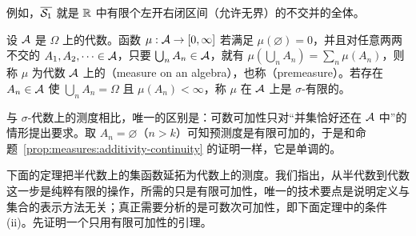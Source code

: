 例如，$\overline{\mathcal{S}_1}$ 就是 $\mathbb{R}$ 中有限个左开右闭区间（允许无界）的不交并的全体。


\begin{definition}[代数上的测度]\label{def:extension:premeasure}
设 $\mathcal{A}$ 是 $\Omega$ 上的代数。函数 $\mu:\mathcal{A}\to[0,\infty]$ 若满足 $\mu(\varnothing)=0$，并且对任意两两不交的 $A_1,A_2,\dots\in\mathcal{A}$，只要 $\bigcup_nA_n\in\mathcal{A}$，就有 $\mu(\bigcup_nA_n)=\sum_n\mu(A_n)$，则称 $\mu$ 为代数 $\mathcal{A}$ 上的（measure on an algebra），也称（premeasure）。若存在 $A_n\in\mathcal{A}$ 使 $\bigcup_nA_n=\Omega$ 且 $\mu(A_n)<\infty$，称 $\mu$ 在 $\mathcal{A}$ 上是 $\sigma$-有限的。
\end{definition}

与 $\sigma$-代数上的测度相比，唯一的区别是：可数可加性只对“并集恰好还在 $\mathcal{A}$ 中”的情形提出要求。取 $A_n=\varnothing$（$n>k$）可知预测度是有限可加的，于是和命题~\ref{prop:measures:additivity-continuity} 的证明一样，它是单调的。

下面的定理把半代数上的集函数延拓为代数上的测度。我们指出，从半代数到代数这一步是纯粹有限的操作，所需的只是有限可加性，唯一的技术要点是说明定义与集合的表示方法无关；真正需要分析的是可数次可加性，即下面定理中的条件 (ii)。先证明一个只用有限可加性的引理。

